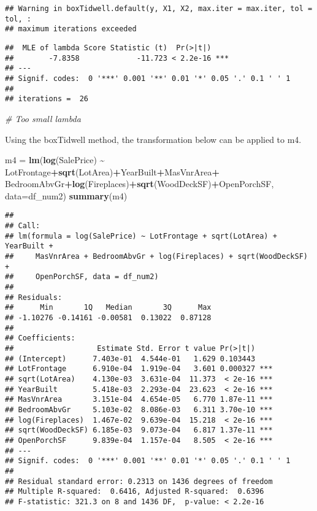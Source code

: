 \documentclass[
]{article}
\newenvironment{Shaded}{\begin{snugshade}}{\end{snugshade}}
\newcommand{\AttributeTok}[1]{\textcolor[rgb]{0.13,0.29,0.53}{#1}}
\newcommand{\CommentTok}[1]{\textcolor[rgb]{0.56,0.35,0.01}{\textit{#1}}}
\newcommand{\FunctionTok}[1]{\textcolor[rgb]{0.13,0.29,0.53}{\textbf{#1}}}
\newcommand{\NormalTok}[1]{#1}
\newcommand{\OtherTok}[1]{\textcolor[rgb]{0.56,0.35,0.01}{#1}}
\newcommand{\SpecialCharTok}[1]{\textcolor[rgb]{0.81,0.36,0.00}{\textbf{#1}}}
\begin{document}
\begin{verbatim}
## Warning in boxTidwell.default(y, X1, X2, max.iter = max.iter, tol = tol, :
## maximum iterations exceeded
\end{verbatim}

\begin{verbatim}
##  MLE of lambda Score Statistic (t)  Pr(>|t|)    
##        -7.8358             -11.723 < 2.2e-16 ***
## ---
## Signif. codes:  0 '***' 0.001 '**' 0.01 '*' 0.05 '.' 0.1 ' ' 1
## 
## iterations =  26
\end{verbatim}

\begin{Shaded}
\begin{Highlighting}[]
\CommentTok{\# Too small lambda}
\end{Highlighting}
\end{Shaded}

Using the boxTidwell method, the transformation below can be applied to
m4.

\begin{Shaded}
\begin{Highlighting}[]
\NormalTok{m4 }\OtherTok{=} \FunctionTok{lm}\NormalTok{(}\FunctionTok{log}\NormalTok{(SalePrice) }\SpecialCharTok{\textasciitilde{}}\NormalTok{ LotFrontage}\SpecialCharTok{+}\FunctionTok{sqrt}\NormalTok{(LotArea)}\SpecialCharTok{+}\NormalTok{YearBuilt}\SpecialCharTok{+}\NormalTok{MasVnrArea}\SpecialCharTok{+}
\NormalTok{          BedroomAbvGr}\SpecialCharTok{+}\FunctionTok{log}\NormalTok{(Fireplaces)}\SpecialCharTok{+}\FunctionTok{sqrt}\NormalTok{(WoodDeckSF)}\SpecialCharTok{+}\NormalTok{OpenPorchSF,}
        \AttributeTok{data=}\NormalTok{df\_num2)}
\FunctionTok{summary}\NormalTok{(m4)}
\end{Highlighting}
\end{Shaded}

\begin{verbatim}
## 
## Call:
## lm(formula = log(SalePrice) ~ LotFrontage + sqrt(LotArea) + YearBuilt + 
##     MasVnrArea + BedroomAbvGr + log(Fireplaces) + sqrt(WoodDeckSF) + 
##     OpenPorchSF, data = df_num2)
## 
## Residuals:
##      Min       1Q   Median       3Q      Max 
## -1.10276 -0.14161 -0.00581  0.13022  0.87128 
## 
## Coefficients:
##                   Estimate Std. Error t value Pr(>|t|)    
## (Intercept)      7.403e-01  4.544e-01   1.629 0.103443    
## LotFrontage      6.910e-04  1.919e-04   3.601 0.000327 ***
## sqrt(LotArea)    4.130e-03  3.631e-04  11.373  < 2e-16 ***
## YearBuilt        5.418e-03  2.293e-04  23.623  < 2e-16 ***
## MasVnrArea       3.151e-04  4.654e-05   6.770 1.87e-11 ***
## BedroomAbvGr     5.103e-02  8.086e-03   6.311 3.70e-10 ***
## log(Fireplaces)  1.467e-02  9.639e-04  15.218  < 2e-16 ***
## sqrt(WoodDeckSF) 6.185e-03  9.073e-04   6.817 1.37e-11 ***
## OpenPorchSF      9.839e-04  1.157e-04   8.505  < 2e-16 ***
## ---
## Signif. codes:  0 '***' 0.001 '**' 0.01 '*' 0.05 '.' 0.1 ' ' 1
## 
## Residual standard error: 0.2313 on 1436 degrees of freedom
## Multiple R-squared:  0.6416, Adjusted R-squared:  0.6396 
## F-statistic: 321.3 on 8 and 1436 DF,  p-value: < 2.2e-16
\end{verbatim}
\end{document}
